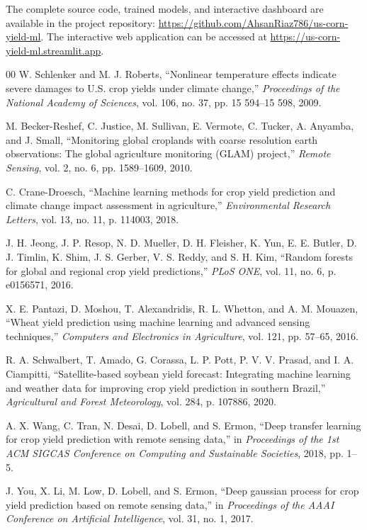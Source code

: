 \documentclass[conference]{IEEEtran}
\begin{document}
The complete source code, trained models, and interactive dashboard are available in the project repository: \url{https://github.com/AhsanRiaz786/us-corn-yield-ml}. The interactive web application can be accessed at \url{https://us-corn-yield-ml.streamlit.app}.

\begin{thebibliography}{00}
 W. Schlenker and M. J. Roberts, ``Nonlinear temperature effects indicate severe damages to U.S. crop yields under climate change,'' \textit{Proceedings of the National Academy of Sciences}, vol. 106, no. 37, pp. 15 594--15 598, 2009.

 M. Becker-Reshef, C. Justice, M. Sullivan, E. Vermote, C. Tucker, A. Anyamba, and J. Small, ``Monitoring global croplands with coarse resolution earth observations: The global agriculture monitoring (GLAM) project,'' \textit{Remote Sensing}, vol. 2, no. 6, pp. 1589--1609, 2010.

 C. Crane-Droesch, ``Machine learning methods for crop yield prediction and climate change impact assessment in agriculture,'' \textit{Environmental Research Letters}, vol. 13, no. 11, p. 114003, 2018.

 J. H. Jeong, J. P. Resop, N. D. Mueller, D. H. Fleisher, K. Yun, E. E. Butler, D. J. Timlin, K. Shim, J. S. Gerber, V. S. Reddy, and S. H. Kim, ``Random forests for global and regional crop yield predictions,'' \textit{PLoS ONE}, vol. 11, no. 6, p. e0156571, 2016.

 X. E. Pantazi, D. Moshou, T. Alexandridis, R. L. Whetton, and A. M. Mouazen, ``Wheat yield prediction using machine learning and advanced sensing techniques,'' \textit{Computers and Electronics in Agriculture}, vol. 121, pp. 57--65, 2016.

 R. A. Schwalbert, T. Amado, G. Corassa, L. P. Pott, P. V. V. Prasad, and I. A. Ciampitti, ``Satellite-based soybean yield forecast: Integrating machine learning and weather data for improving crop yield prediction in southern Brazil,'' \textit{Agricultural and Forest Meteorology}, vol. 284, p. 107886, 2020.

 A. X. Wang, C. Tran, N. Desai, D. Lobell, and S. Ermon, ``Deep transfer learning for crop yield prediction with remote sensing data,'' in \textit{Proceedings of the 1st ACM SIGCAS Conference on Computing and Sustainable Societies}, 2018, pp. 1--5.

 J. You, X. Li, M. Low, D. Lobell, and S. Ermon, ``Deep gaussian process for crop yield prediction based on remote sensing data,'' in \textit{Proceedings of the AAAI Conference on Artificial Intelligence}, vol. 31, no. 1, 2017.

\end{thebibliography}
\end{document}
